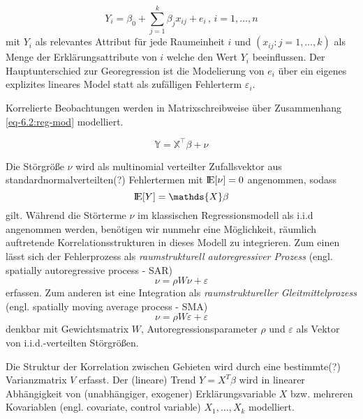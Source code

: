 \begin{equation} \label{eq-6.1:reg-mod-gen}
    Y_{i}=\beta_{0}+\sum_{j=1}^{k} \beta_{j} x_{ij} +e_{i} \, , \, i=1,\ldots,n
\end{equation}
mit $Y_i$ als relevantes Attribut für jede Raumeinheit $i$ und $(x_{ij}:j=1,\ldots ,k)$ als Menge der
Erklärungsattribute von $i$ welche den Wert $Y_{i}$ beeinflussen. Der Hauptunterschied zur Georegression ist
die Modelierung von $e_{i}$ über ein eigenes explizites lineares Model statt als zufälligen Fehlerterm $\varepsilon_{i}$.

Korrelierte Beobachtungen werden in Matrixschreibweise über Zusammenhang \eqref{eq-6.2:reg-mod} modelliert.

\begin{equation} \label{eq-6.2:reg-mod}
    \mathds{Y} = \mathds{X}^{\intercal} \beta + \nu 
\end{equation}

Die Störgröße $\nu$ wird als multinomial verteilter Zufallsvektor aus standardnormalverteilten(?) Fehlertermen 
mit ${\rm I\!E}[\nu]=0$ angenommen, sodass
\begin{equation*}
    \bbbe[Y]=\mathds{X} \beta
\end{equation*}
gilt.
Während die Störterme $\nu$ im klassischen Regressionsmodell als i.i.d angenommen werden, benötigen wir nunmehr 
eine Möglichkeit, räumlich auftretende Korrelationsstrukturen in dieses Modell zu integrieren. Zum einen 
lässt sich der Fehlerprozess als \emph{raumstrukturell autoregressiver Prozess} 
(engl. spatially autoregressive process - SAR)
\begin{equation*}
    \nu = \rho W \nu + \varepsilon
\end{equation*}
erfassen. Zum anderen ist eine Integration als \emph{raumstruktureller Gleitmittelprozess} (engl. spatially 
moving average process - SMA)
\begin{equation*}
    \nu = \rho W \varepsilon + \varepsilon
\end{equation*}
denkbar mit Gewichtsmatrix $W$, Autoregressionsparameter $\rho$ und $\varepsilon$ als 
Vektor von i.i.d.-verteilten Störgrößen. 


Die Struktur der Korrelation zwischen Gebieten wird durch eine bestimmte(?) Varianzmatrix $V$ erfasst.
Der (lineare) Trend $Y = X^{T} \beta$ wird in linearer 
Abhängigkeit von (unabhängiger, exogener) Erklärungsvariable $X$ bzw. mehreren 
Kovariablen (engl. covariate, control variable) $X_1,\ldots,X_k$ modelliert.  

